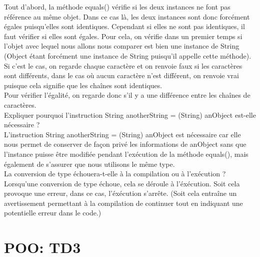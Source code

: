 \documentclass{article}
\begin{document}
Tout d’abord, la méthode equals() vérifie si les deux instances ne font pas référence au
même objet. Dans ce cas là, les deux instances sont donc forcément égales puisqu'elles
sont identiques. Cependant si elles ne sont pas identiques, il faut vérifier si elles sont égales. Pour cela, on vérifie dans un premier temps si l’objet avec lequel nous allons nous comparer est bien une instance de String (Object étant forcément une instance de String puisqu’il appelle cette méthode). Si c’est le cas, on regarde chaque caractère et on renvoie faux si les caractères sont différents, dans le cas où aucun caractère n’est différent, on renvoie vrai puisque cela signifie que les chaînes sont identiques.
\\
Pour vérifier l'égalité, on regarde donc s’il y a une différence entre les chaînes de
caractères.
\\
Expliquer pourquoi l’instruction String anotherString = (String) anObject est-elle
nécessaire ?\\
L’instruction String anotherString = (String) anObject est nécessaire car elle nous permet de conserver de façon privé les informations de anObject sans que l’instance puisse être modifiée pendant l’exécution de la méthode equals(), mais également de s’assurer que nous utilisons le même type.\\
La conversion de type échouera-t-elle à la compilation ou à l’exécution ?\\
Lorsqu’une conversion de type échoue, cela se déroule à l'éxécution. Soit cela provoque
une erreur, dans ce cas, l'éxécution s’arrête. (Soit cela entraîne un avertissement
permettant à la compilation de continuer tout en indiquant une potentielle erreur dans le
code.)
\section{POO: TD3}
\end{document}
